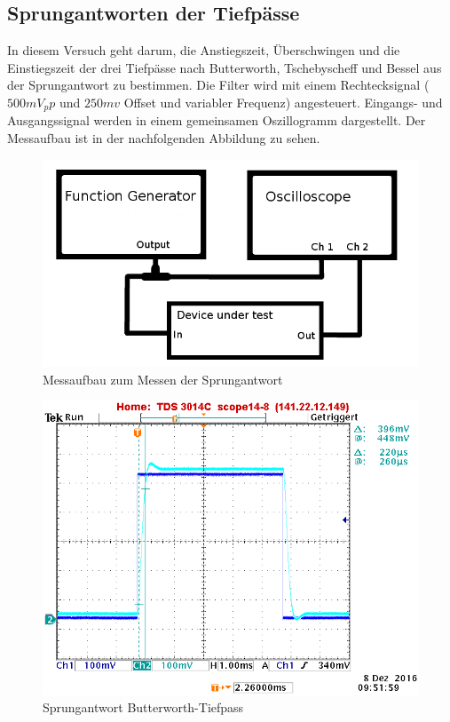 \newpage

\subsection{Sprungantworten der Tiefpässe}
\noindent In diesem Versuch geht darum, die Anstiegszeit, Überschwingen und die Einstiegszeit der drei Tiefpässe nach Butterworth, Tschebyscheff und Bessel aus der Sprungantwort zu bestimmen. Die Filter wird mit einem Rechtecksignal ($500mV_pp$ und $250mv$ Offset und variabler Frequenz) angesteuert. Eingangs- und Ausgangssignal werden in einem gemeinsamen Oszillogramm dargestellt. Der Messaufbau ist in der nachfolgenden Abbildung zu sehen.

\begin{figure}[h]
\centering
\includegraphics[width=0.7\linewidth]{Bilder/Messaufbau_Oszi}
\caption{Messaufbau zum Messen der Sprungantwort}
\label{fig:Messaufbau_Oszi}
\end{figure}


\begin{figure}[h]
\centering
\includegraphics[width=0.7\linewidth]{Bilder/ImLabor/Sprungantwort_5_8_Butter_Anstiegszeit}
\caption{Sprungantwort Butterworth-Tiefpass}
\label{fig:Sprungantwort_5_8_Butter_Anstiegszeit}
\end{figure}

